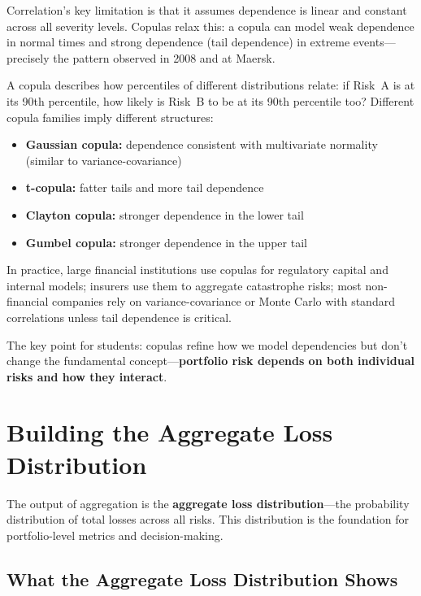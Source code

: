 \documentclass[11pt,openany]{book}
\providecommand{\tightlist}{\setlength{\itemsep}{0pt}\setlength{\parskip}{0pt}}
\begin{document}
Correlation's key limitation is that it assumes dependence is linear and
constant across all severity levels. Copulas relax this: a copula can model
weak dependence in normal times and strong dependence (tail dependence) in
extreme events---precisely the pattern observed in 2008 and at Maersk.

A copula describes how percentiles of different distributions relate: if
Risk~A is at its 90th percentile, how likely is Risk~B to be at its 90th
percentile too? Different copula families imply different structures:
\begin{itemize}\tightlist
  \item \textbf{Gaussian copula:} dependence consistent with multivariate
        normality (similar to variance-covariance)
  \item \textbf{t-copula:} fatter tails and more tail dependence
  \item \textbf{Clayton copula:} stronger dependence in the lower tail
  \item \textbf{Gumbel copula:} stronger dependence in the upper tail
\end{itemize}

In practice, large financial institutions use copulas for regulatory capital
and internal models; insurers use them to aggregate catastrophe risks; most
non-financial companies rely on variance-covariance or Monte Carlo with
standard correlations unless tail dependence is critical.

The key point for students: copulas refine how we model dependencies but don't
change the fundamental concept---\textbf{portfolio risk depends on both
individual risks and how they interact}.

\section{Building the Aggregate Loss Distribution}
\label{sec:aggregate-distribution}

The output of aggregation is the \textbf{aggregate loss distribution}---the
probability distribution of total losses across all risks. This distribution
is the foundation for portfolio-level metrics and decision-making.

\subsection{What the Aggregate Loss Distribution Shows}
\label{subsec:what-distribution-shows}
\end{document}
